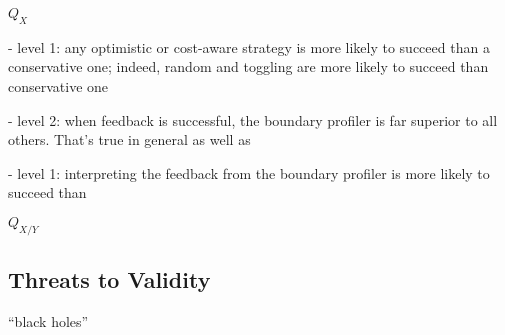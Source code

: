 	












$Q_X$

- level 1: any optimistic or cost-aware strategy is more likely to
  succeed than a conservative one; indeed, random and toggling are
  more likely to succeed than conservative one

- level 2: when feedback is successful, the boundary profiler
  is far superior to all others. That's true in general as well as 

- level 1: interpreting the feedback from the boundary
  profiler is more likely to succeed than 



$Q_{X/Y}$

\subsection{Threats to Validity}


``black holes''
